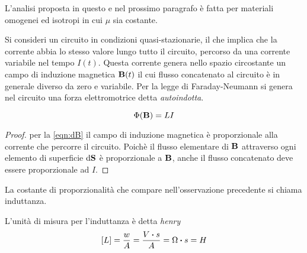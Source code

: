 L'analisi proposta in questo e nel prossimo paragrafo è fatta per materiali omogenei ed isotropi in cui $\mu$ sia costante.

Si consideri un circuito in condizioni quasi-stazionarie, il che implica che la corrente abbia
lo stesso valore lungo tutto il circuito, percorso da una corrente variabile nel tempo $I(t)$.
Questa corrente genera nello spazio circostante un campo di induzione magnetica $\vb{B}(t)$ il cui
flusso concatenato al circuito è in generale diverso da zero e variabile.
Per la legge di Faraday-Neumann si genera nel circuito una forza elettromotrice detta \textit{autoindotta}.
\begin{obs}
    \begin{equation}
        \label{eqn:induttanza}
        \Phi(\vb{B})=LI
    \end{equation}
\end{obs}
\begin{proof}
    per la \eqref{eqn:dB} il campo di induzione magnetica è proporzionale alla corrente che percorre il circuito.
    Poichè il flusso elementare di $\vb{B}$ attraverso ogni elemento di superficie $\dd{\vb{S}}$ è
    proporzionale a $\vb{B}$, anche il flusso concatenato deve essere proporzionale ad $I$.
\end{proof}
\begin{defn}[Induttanza]
    La costante di proporzionalità che compare nell'osservazione precedente si chiama induttanza.
\end{defn}
L'unità di misura per l'induttanza è detta \textit{henry}
\[
    [L]=\frac{w}{A}=\frac{V \vdot s}{A}=\Omega \vdot s = H
\]

